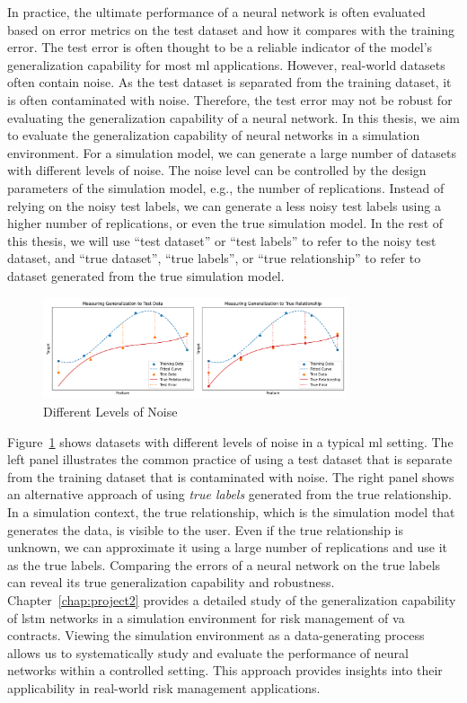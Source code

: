 In practice, the ultimate performance of a neural network is often evaluated based on error metrics on the test dataset and how it compares with the training error.
The test error is often thought to be a reliable indicator of the model's generalization capability for most \gls{ml} applications.
However, real-world datasets often contain noise.
As the test dataset is separated from the training dataset, it is often contaminated with noise.
Therefore, the test error may not be robust for evaluating the generalization capability of a neural network.
In this thesis, we aim to evaluate the generalization capability of neural networks in a simulation environment.
For a simulation model, we can generate a large number of datasets with different levels of noise.
The noise level can be controlled by the design parameters of the simulation model, e.g., the number of replications.
Instead of relying on the noisy test labels, we can generate a less noisy test labels using a higher number of replications, or even the true simulation model.
In the rest of this thesis, we will use ``test dataset'' or ``test labels'' to refer to the noisy test dataset, and ``true dataset'', ``true labels'', or ``true relationship'' to refer to dataset generated from the true simulation model.

\begin{figure}[ht!] 
    \centering
    \includegraphics[width=0.8\textwidth]{./project2/figures/datasets.png}
    \caption{Different Levels of Noise}
    \label{fig:datasets}
\end{figure}

Figure~\ref{fig:datasets} shows datasets with different levels of noise in a typical \gls{ml} setting.
The left panel illustrates the common practice of using a test dataset that is separate from the training dataset that is contaminated with noise.
The right panel shows an alternative approach of using \textit{true labels} generated from the true relationship.
In a simulation context, the true relationship, which is the simulation model that generates the data, is visible to the user.
Even if the true relationship is unknown, we can approximate it using a large number of replications and use it as the true labels.
Comparing the errors of a neural network on the true labels can reveal its true generalization capability and robustness.
Chapter~\ref{chap:project2} provides a detailed study of the generalization capability of \gls{lstm} networks in a simulation environment for risk management of \gls{va} contracts.
Viewing the simulation environment as a data-generating process allows us to systematically study and evaluate the performance of neural networks within a controlled setting.
This approach provides insights into their applicability in real-world risk management applications.

